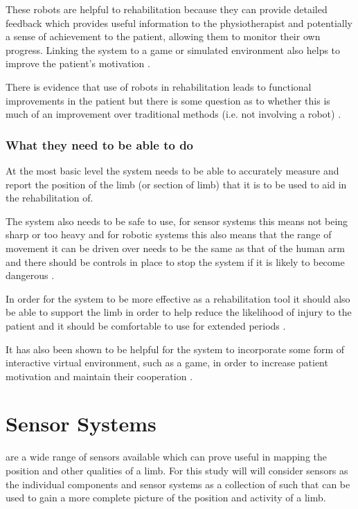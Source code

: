 \documentclass[journal]{IEEEtran}
\begin{document}
These robots are helpful to rehabilitation because they can provide detailed feedback which 
provides useful information to the physiotherapist and potentially a sense of achievement to 
the patient, allowing them to monitor their own progress. Linking the system to a game or simulated 
environment also helps to improve the patient's motivation \cite{AdvancesPush}.

There is evidence that use of robots in rehabilitation leads to functional improvements in the patient 
but there is some question as to whether this is much of an improvement over traditional methods 
(i.e. not involving a robot) \cite{AdvancesPush}.

\subsubsection{What they need to be able to do}
At the most basic level the system needs to be able to accurately measure and report the 
position of the limb (or section of limb) that it is to be used to aid in the rehabilitation of.

The system also needs to be safe to use, for sensor systems this means not being sharp 
or too heavy and for robotic systems this also means that the range of movement it can be 
driven over needs to be the same as that of the human arm and there should be controls in 
place to stop the system if it is likely to become dangerous \cite{ARMin}.

In order for the system to be more effective as a rehabilitation tool it should also be able to 
support the limb in order to help reduce the likelihood of injury to the patient and it should 
be comfortable to use for extended periods \cite{AdvancesPush}.

It has also been shown to be helpful for the system to incorporate some form of interactive 
virtual environment, such as a game, in order to increase patient motivation and maintain 
their cooperation \cite{AdvancesPush}.

\section{Sensor Systems}
 are a wide range of sensors available which can prove useful in 
mapping the position and other qualities of a limb. For this study will will consider sensors 
as the individual components and sensor systems as a collection of such that can be used 
to gain a more complete picture of the position and activity of a limb.
\end{document}

